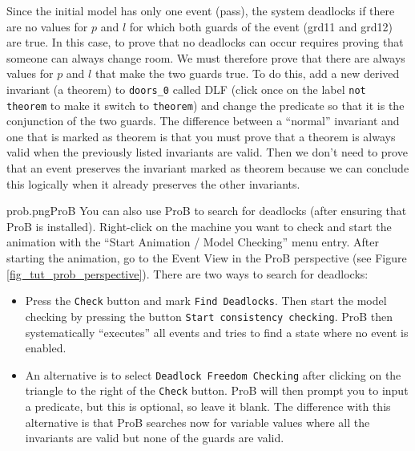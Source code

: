 Since the initial model has only one event (\textsf{pass}), the system deadlocks if there are no values for $p$ and $l$ for which both guards of the event (\textsf{grd11} and \textsf{grd12}) are true.
In this case, to prove that no deadlocks can occur requires proving that someone can always change room. We must therefore prove that there are always values for $p$ and $l$ that make the two guards true.
To do this, add a new derived invariant (a theorem) to \texttt{doors\_0} called \textsf{DLF} (click once on the label \texttt{not theorem} to make it switch to \texttt{theorem})
  and change the predicate so that it is the conjunction of the two guards.
The difference between a ``normal'' invariant and one that is marked as theorem is that you must prove that a theorem is always valid when the previously listed invariants are valid. Then we don't need to prove that an event preserves the invariant marked as theorem because we can conclude this logically when it already preserves the other invariants.



\begin{rodin-plugin}{prob.png}{ProB}%
  You can also use ProB to search for deadlocks (after ensuring that ProB is installed).
  Right-click on the machine you want to check and start the animation with the
  ``Start Animation / Model Checking'' menu entry.
  After starting the animation, go to the Event View in the ProB perspective
  (see Figure \ref{fig_tut_prob_perspective}).
  There are two ways to search for deadlocks:
  \begin{itemize}
  \item Press the \texttt{Check} button and mark \texttt{Find Deadlocks}. Then start the model checking by pressing the button \texttt{Start consistency checking}.
    ProB then systematically ``executes'' all events and tries to find a state where no
    event is enabled.
  \item An alternative is to select \texttt{Deadlock Freedom Checking} after clicking
    on the triangle to the right of the \texttt{Check} button.
    ProB will then prompt you to input a predicate, but this is optional, so leave it blank. The difference with this alternative is that ProB searches now for variable values
    where all the invariants are valid but none of the guards are valid.
  \end{itemize}
\end{rodin-plugin}

